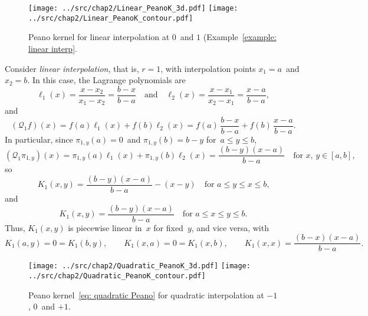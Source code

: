 \begin{figure}
\caption{Peano kernel for linear interpolation at $0$~and $1$
(Example~\ref{example: linear interp}.}
\label{fig: linear Peano}
\begin{center}
\texttt{[image: ../src/chap2/Linear\_PeanoK\_3d.pdf]}
\texttt{[image: ../src/chap2/Linear\_PeanoK\_contour.pdf]}
\end{center}
\end{figure}

\begin{example}\label{example: linear interp}
Consider \emph{linear interpolation}, that is, $r=1$, with interpolation points 
$x_1=a$~and $x_2=b$.  In this case, the Lagrange polynomials are
\[
\ell_1(x)=\frac{x-x_2}{x_1-x_2}=\frac{b-x}{b-a}
\quad\text{and}\quad
\ell_2(x)=\frac{x-x_1}{x_2-x_1}=\frac{x-a}{b-a},
\]
and
\[
(\mathcal{Q}_1f)(x)=f(a)\ell_1(x)+f(b)\ell_2(x)
	=f(a)\,\frac{b-x}{b-a}+f(b)\,\frac{x-a}{b-a}.
\]
In particular, since $\pi_{1,y}(a)=0$~and $\pi_{1,y}(b)=b-y$ for~$a\le y\le b$,
\[
(\mathcal{Q}_1\pi_{1,y})(x)=\pi_{1,y}(a)\ell_1(x)+\pi_{1,y}(b)\ell_2(x)
	=\frac{(b-y)(x-a)}{b-a}\quad\text{for $x$, $y\in[a,b]$,}
\]
so
\[
K_1(x,y)=\frac{(b-y)(x-a)}{b-a}-(x-y)\quad\text{for $a\le y\le x\le b$,}
\]
and
\[
K_1(x,y)=\frac{(b-y)(x-a)}{b-a}\quad\text{for $a\le x\le y\le b$.}
\]
Thus, $K_1(x,y)$ is piecewise linear in~$x$ for fixed~$y$, and vice versa, with
\[
K_1(a,y)=0=K_1(b,y),\qquad K_1(x,a)=0=K_1(x,b),\qquad
K_1(x,x)=\frac{(b-x)(x-a)}{b-a}.
\]
\end{example}

\begin{figure}
\caption{Peano kernel~\eqref{eq: quadratic Peano} for quadratic interpolation 
at $-1$, $0$~and $+1$.}\label{fig: quadratic Peano}
\begin{center}
\texttt{[image: ../src/chap2/Quadratic\_PeanoK\_3d.pdf]}
\texttt{[image: ../src/chap2/Quadratic\_PeanoK\_contour.pdf]}
\end{center}
\end{figure}

